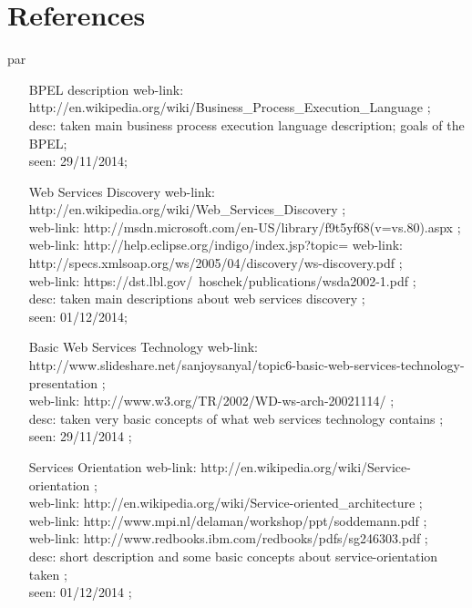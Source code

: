 \section{References}
par{
\begin{enumerate}
\item [BPEL description] web-link: http://en.wikipedia.org/wiki/Business_Process_Execution_Language ; \\ desc: taken main business process execution language description; goals of the BPEL; \\ seen: 29/11/2014; \\
\item [Web Services Discovery] web-link: http://en.wikipedia.org/wiki/Web_Services_Discovery ; \\ 
web-link: http://msdn.microsoft.com/en-US/library/f9t5yf68(v=vs.80).aspx ; \\
web-link: http://help.eclipse.org/indigo/index.jsp?topic=%
web-link: http://specs.xmlsoap.org/ws/2005/04/discovery/ws-discovery.pdf ; \\
web-link: https://dst.lbl.gov/~hoschek/publications/wsda2002-1.pdf ; \\
desc: taken main descriptions about web services discovery ; \\ seen: 01/12/2014; \\
\item [Basic Web Services Technology] web-link: http://www.slideshare.net/sanjoysanyal/topic6-basic-web-services-technology-presentation ; \\ 
web-link: http://www.w3.org/TR/2002/WD-ws-arch-20021114/ ; \\ desc: taken very basic concepts of what web services technology contains ; \\ seen: 29/11/2014 ; \\
\item [Services Orientation] web-link: http://en.wikipedia.org/wiki/Service-orientation ; \\ 
web-link: http://en.wikipedia.org/wiki/Service-oriented_architecture ; \\ 
web-link: http://www.mpi.nl/delaman/workshop/ppt/soddemann.pdf ; \\ 
web-link: http://www.redbooks.ibm.com/redbooks/pdfs/sg246303.pdf ; \\ desc: short description and some basic concepts about service-orientation taken ; \\ seen: 01/12/2014 ; \\

\end{enumerate}}
